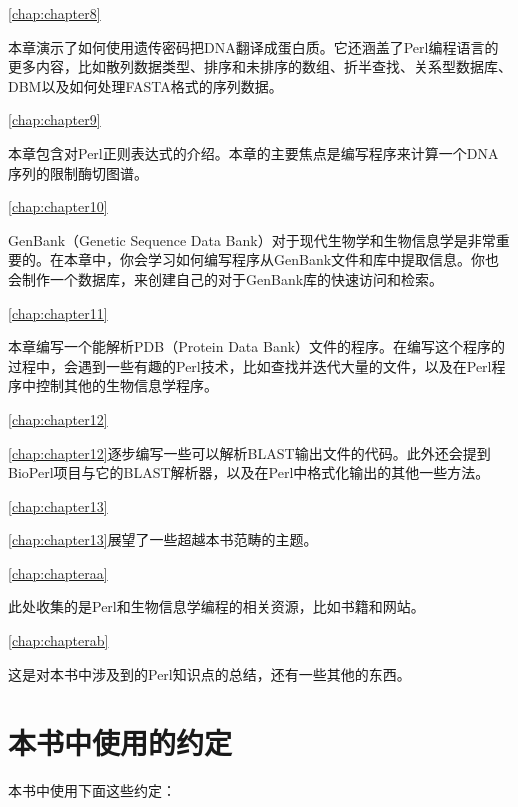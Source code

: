 \autoref{chap:chapter8}
\begin{adjustwidth}{4em}{0cm}
本章演示了如何使用遗传密码把DNA翻译成蛋白质。它还涵盖了Perl编程语言的更多内容，比如散列数据类型、排序和未排序的数组、折半查找、关系型数据库、DBM以及如何处理FASTA格式的序列数据。
\end{adjustwidth}

\autoref{chap:chapter9}
\begin{adjustwidth}{4em}{0cm}
本章包含对Perl正则表达式的介绍。本章的主要焦点是编写程序来计算一个DNA序列的限制酶切图谱。
\end{adjustwidth}

\autoref{chap:chapter10}
\begin{adjustwidth}{4em}{0cm}
GenBank（Genetic Sequence Data Bank）对于现代生物学和生物信息学是非常重要的。在本章中，你会学习如何编写程序从GenBank文件和库中提取信息。你也会制作一个数据库，来创建自己的对于GenBank库的快速访问和检索。
\end{adjustwidth}

\autoref{chap:chapter11}
\begin{adjustwidth}{4em}{0cm}
本章编写一个能解析PDB（Protein Data Bank）文件的程序。在编写这个程序的过程中，会遇到一些有趣的Perl技术，比如查找并迭代大量的文件，以及在Perl程序中控制其他的生物信息学程序。
\end{adjustwidth}

\autoref{chap:chapter12}
\begin{adjustwidth}{4em}{0cm}
\autoref{chap:chapter12}逐步编写一些可以解析BLAST输出文件的代码。此外还会提到BioPerl项目与它的BLAST解析器，以及在Perl中格式化输出的其他一些方法。
\end{adjustwidth}

\autoref{chap:chapter13}
\begin{adjustwidth}{4em}{0cm}
\autoref{chap:chapter13}展望了一些超越本书范畴的主题。
\end{adjustwidth}

\autoref{chap:chapteraa}
\begin{adjustwidth}{4em}{0cm}
此处收集的是Perl和生物信息学编程的相关资源，比如书籍和网站。
\end{adjustwidth}

\autoref{chap:chapterab}
\begin{adjustwidth}{4em}{0cm}
这是对本书中涉及到的Perl知识点的总结，还有一些其他的东西。
\end{adjustwidth}

\section*{本书中使用的约定}
本书中使用下面这些约定：

